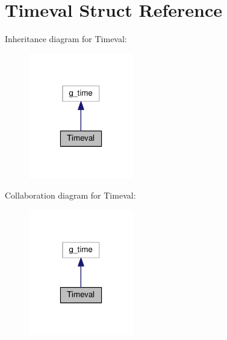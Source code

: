 \hypertarget{classTimeval}{}\section{Timeval Struct Reference}
\label{classTimeval}


Inheritance diagram for Timeval\+:
\nopagebreak
\begin{figure}[H]
\begin{center}
\leavevmode
\includegraphics[width=130pt]{classTimeval__inherit__graph}
\end{center}
\end{figure}


Collaboration diagram for Timeval\+:
\nopagebreak
\begin{figure}[H]
\begin{center}
\leavevmode
\includegraphics[width=130pt]{classTimeval__coll__graph}
\end{center}
\end{figure}
